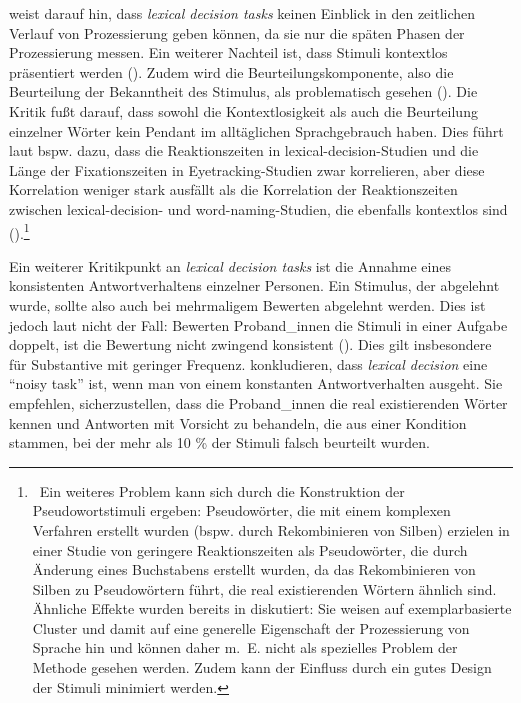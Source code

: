 \textcite[96]{Baayen.2014} weist darauf hin, dass \textit{lexical decision tasks} keinen Einblick in den zeitlichen Verlauf von Prozessierung geben können, da sie nur die späten Phasen der Prozessierung messen. Ein weiterer Nachteil ist, dass Stimuli kontextlos präsentiert werden (\cite[96]{Baayen.2014}). Zudem wird die Beurteilungskomponente, also die Beurteilung der Bekanntheit des Stimulus,  als problematisch gesehen (\cite[30--31]{Haberlandt.1994}). Die Kritik fußt darauf, dass sowohl die Kontextlosigkeit als auch die Beurteilung einzelner Wörter kein Pendant im alltäglichen Sprachgebrauch haben. Dies führt laut \textcite[96]{Baayen.2014} bspw. dazu, dass die Reaktionszeiten in lexical-decision-Studien und die Länge der Fixationszeiten in Eye\-tracking-Studien zwar korrelieren, aber diese Korrelation weniger stark ausfällt als die Korrelation der Reaktionszeiten zwischen lexical-decision- und word-naming-Studien, die ebenfalls kontextlos sind (\cite[21]{Kuperman.2013}).\footnote{
\ Ein weiteres Problem kann sich durch die Konstruktion der Pseudowortstimuli ergeben: Pseudowörter, die mit einem komplexen Verfahren erstellt wurden (bspw. durch Rekombinieren von Silben) erzielen in einer Studie von \textcite[6--7]{Keuleers.2010} geringere Reaktionszeiten als Pseudowörter, die durch Änderung eines Buchstabens erstellt wurden, da das Rekombinieren von Silben zu Pseudowörtern führt, die real existierenden Wörtern ähnlich sind. Ähnliche Effekte wurden bereits in  diskutiert: Sie weisen auf exemplarbasierte Cluster und damit auf eine generelle Eigenschaft der Prozessierung von Sprache hin und können daher m.~E. nicht als spezielles Problem der Methode gesehen werden. Zudem kann der Einfluss durch ein gutes Design der Stimuli minimiert werden.} 



Ein weiterer Kritikpunkt an \textit{lexical decision tasks} ist die Annahme eines konsistenten Antwortverhaltens einzelner Personen. Ein Stimulus, der abgelehnt wurde, sollte also auch bei mehrmaligem Bewerten abgelehnt werden. Dies ist jedoch laut \textcite{Diependaele.2012} nicht der Fall: Bewerten Proband\_innen die Stimuli in einer Aufgabe doppelt, ist die Bewertung nicht zwingend konsistent (\cite[5--8]{Diependaele.2012}). Dies gilt insbesondere für Substantive mit geringer Frequenz. \textcite[8]{Diependaele.2012} konkludieren, dass \textit{lexical decision} eine "`noisy task"' ist, wenn man von einem konstanten Antwortverhalten ausgeht. Sie empfehlen, sicherzustellen, dass die Proband\_innen die real existierenden Wörter kennen und Antworten mit Vorsicht zu behandeln, die aus einer Kondition stammen, bei der mehr als 10 \% der Stimuli falsch beurteilt wurden.  

